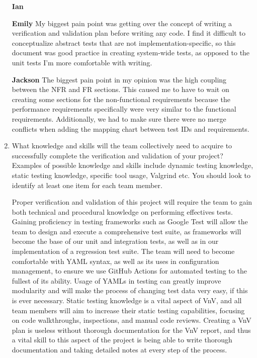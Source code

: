 \documentclass[12pt, titlepage]{article}
\begin{document}
\begin{enumerate}[leftmargin=*]
  \textbf{Ian}

  \textbf{Emily} My biggest pain point was getting over the concept of writing a verification and 
  validation plan before writing any code. I find it difficult to conceptualize abstract tests that are 
  not implementation-specific, so this document was good practice in creating system-wide tests, as 
  opposed to the unit tests I'm more comfortable with writing.

  \textbf{Jackson} The biggest pain point in my opinion was the high coupling between the NFR and FR sections. 
  This caused me to have to wait on creating some sections for the non-functional requirements because the performance 
  requirements specifically were very similar to the functional requirements. Additionally, we had to make sure there were 
  no merge conflicts when adding the mapping chart between test IDs and requirements.

  \item What knowledge and skills will the team collectively need to acquire to
  successfully complete the verification and validation of your project?
  Examples of possible knowledge and skills include dynamic testing knowledge,
  static testing knowledge, specific tool usage, Valgrind etc.  You should look to
  identify at least one item for each team member. 

  \vspace{5pt}
  Proper verification and validation of this project will require the team to gain both technical 
  and procedural knowledge on performing effectives tests. Gaining proficiency in testing frameworks 
  such as Google Test will allow the team to design and execute a comprehensive test suite, as 
  frameworks will become the base of our unit and integration tests, as well as in our implementation 
  of a regression test suite. The team will need to become comfortable with YAML syntax, as well as 
  its uses in configuration management, to ensure we use GitHub Actions for automated testing to the 
  fullest of its ability. Usage of YAMLs in testing can greatly improve modularity and will make the 
  process of changing test data very easy, if this is ever necessary. Static testing knowledge is a 
  vital aspect of VnV, and all team members will aim to increase their static testing capabilities, 
  focusing on code walkthroughs, inspections, and manual code reviews. Creating a VnV plan is useless 
  without thorough documentation for the VnV report, and thus a vital skill to this aspect of the project 
  is being able to write thorough documentation and taking detailed notes at every step of the process.


\end{enumerate}
\end{document}
